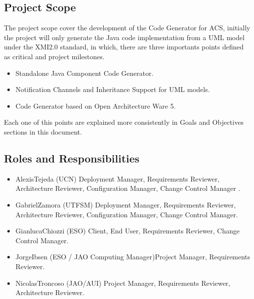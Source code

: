 \subsection{Project Scope}
The project scope cover the development of the Code Generator for ACS,
initially the project will only generate the Java code implementation from a
UML model under the XMI2.0 standard, in which, there are three importants
points defined as critical and project milestones.

\begin{itemize}
	\item Standalone Java Component Code Generator.
	\item Notification Channels and Inheritance Support for UML models.
	\item Code Generator based on Open Architecture Ware 5.
\end{itemize}
Each one of this points are explained more consistently in Goals and Objectives
sections in this document.

\subsection{Roles and Responsibilities}
\begin{itemize}
\item AlexisTejeda (UCN) Deployment Manager, Requirements Reviewer, Architecture
Reviewer, Configuration Manager, Change Control Manager . 
\item GabrielZamora (UTFSM) Deployment Manager, Requirements Reviewer, Architecture Reviewer, Configuration Manager, Change Control Manager.
\item GianlucaChiozzi (ESO) Client, End User, Requirements Reviewer, Change Control Manager.
\item JorgeIbsen (ESO / JAO Computing Manager)Project Manager, Requirements Reviewer.
\item NicolasTroncoso (JAO/AUI) Project Manager, Requirements Reviewer, Architecture Reviewer. 
\end{itemize}

\newpage









